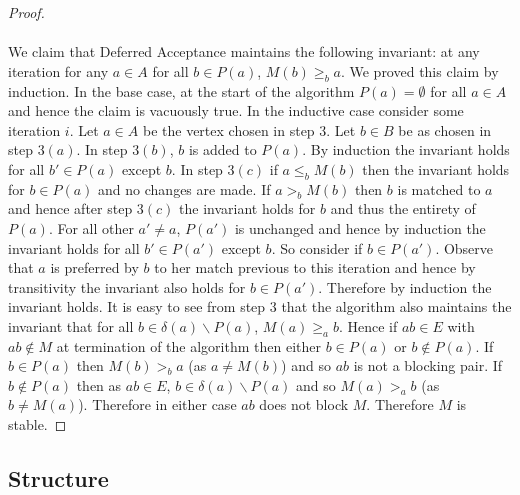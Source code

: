 \begin{proof}
\paragraph{}
We claim that Deferred Acceptance maintains the following invariant: at any iteration for any $a \in A$ for all $b \in P(a)$, $M(b) \geq_b a$. We proved this claim by induction. In the base case, at the start of the algorithm $P(a) = \emptyset$ for all $a \in A$ and hence the claim is vacuously true. In the inductive case consider some iteration $i$. Let $a\in A$ be the vertex chosen in step $3$. Let $b \in B$ be as chosen in step $3(a)$. In step $3(b)$, $b$ is added to $P(a)$. By induction the invariant holds for all $b' \in P(a)$ except $b$. In step $3(c)$ if $a \leq_b M(b)$ then the invariant holds for $b \in P(a)$ and no changes are made. If $a >_b M(b)$ then $b$ is matched to $a$ and hence after step $3(c)$ the invariant holds for $b$ and thus the entirety of $P(a)$. For all other $a' \neq a$, $P(a')$ is unchanged and hence by induction the invariant holds for all $b' \in P(a')$ except $b$. So consider if $b \in P(a')$. Observe that $a$ is preferred by $b$ to her match previous to this iteration and hence by transitivity the invariant also holds for $b \in P(a')$. Therefore by induction the invariant holds. It is easy to see from step $3$ that the algorithm also maintains the invariant that for all $b \in \delta(a)\backslash P(a)$, $M(a) \geq_a b$. Hence if $ab \in E$ with $ab \not\in M$ at termination of the algorithm then either $b \in P(a)$ or $b \not\in P(a)$. If $b \in P(a)$ then $M(b) >_b a$ (as $a \neq M(b)$) and so $ab$ is not a blocking pair. If $b \not\in P(a)$ then as $ab \in E$, $b \in \delta(a) \backslash P(a)$ and so $M(a) >_a b$ (as $b \neq M(a)$). Therefore in either case $ab$ does not block $M$. Therefore $M$ is stable.
\end{proof}
\subsection{Structure}
